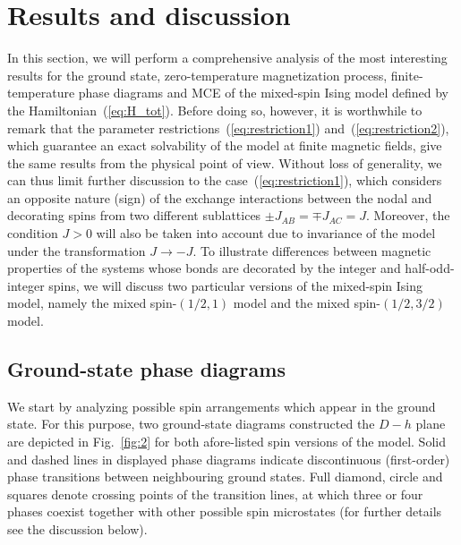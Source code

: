 \documentclass[final,5p,times,sort&compress]{elsarticle}
\begin{document}
\section{Results and discussion}
\label{sec:3}

In this section, we will perform a comprehensive analysis of the most interesting results for the ground state, zero-temperature magnetization process, finite-temperature phase diagrams and MCE of the mixed-spin Ising model defined by the Hamiltonian~(\ref{eq:H_tot}). Before doing so, however, it is worthwhile to remark that the parameter restrictions~(\ref{eq:restriction1}) and~(\ref{eq:restriction2}), which guarantee an exact solvability of the model at finite magnetic fields, give the same results from the physical point of view. Without loss of generality, we can thus limit further discussion to the case~(\ref{eq:restriction1}), which considers an opposite nature (sign) of the exchange interactions between the nodal and decorating spins from two different sublattices $\pm J_{AB} = \mp J_{AC} = J$. Moreover, the condition $J>0$ will also be taken into account due to invariance of the model under the transformation $J\to -J$. To illustrate differences between magnetic properties of the systems whose bonds are decorated by the integer and half-odd-integer spins, we will discuss two particular versions of the mixed-spin Ising model, namely the mixed spin-$(1/2,1)$ model and the mixed spin-$(1/2,3/2)$ model.

\subsection{Ground-state phase diagrams}
\label{subsec:31}

We start by analyzing possible spin arrangements which appear in the ground state. For this purpose, two ground-state diagrams constructed the $D-h$ plane are depicted in Fig.~\ref{fig:2} for both afore-listed spin versions of the model. Solid and dashed lines in displayed phase diagrams indicate discontinuous (first-order) phase transitions between neighbouring ground states. Full diamond, circle and squares denote crossing points of the transition lines, at which three or four phases coexist together with other possible spin microstates (for further details see the discussion below).
\end{document}
